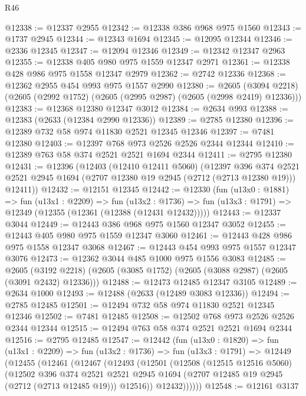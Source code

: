 \begin{lexlean}{R46}
\begin{coremodule}
@12338 := @12337 @2955
@12342 := @12338 @386 @968 @975 @1560
@12343 := @1737 @2945
@12344 := @12343 @1694
@12345 := @12095 @12344
@12346 := @2336 @12345
@12347 := @12094 @12346
@12349 := @12342 @12347 @2963
@12355 := @12338 @405 @980 @975 @1559 @12347 @2971
@12361 := @12338 @428 @986 @975 @1558 @12347 @2979
@12362 := @2742 @12336
@12368 := @12362 @2955 @454 @993 @975 @1557 @2990
@12380 := @2605
    (@3094 @2218)
    (@2605 (@2992 @1752) (@2605 (@2995 @2987) (@2605 (@2998 @2419) @12336)))
@12383 := @12368 @12380 @12347 @3012
@12384 := @2634 @993
@12388 := @12383 (@2633 (@12384 @2990 @12336))
@12389 := @2785 @12380
@12396 := @12389 @732 @58 @974 @11830 @2521 @12345 @12346
@12397 := @7481 @12380
@12403 := @12397 @768 @973 @2526 @2526 @2344 @12344
@12410 := @12389 @763 @58 @374 @2521 @2521 @1694 @2344
@12411 := @2795 @12380
@12431 := @12396
    (@12403
      (@12410 @12411 @5060)
      (@12397
        @396
        @374
        @2521
        @2521
        @2945
        @1694
        (@2707 @12380 @19 @2945 (@2712 (@2713 @12380 @19)))
        @12411))
@12432 := @12151 @12345
@12442 := @12330
    (fun (u13x0 : @1881) =>
    fun (u13x1 : @2209) =>
    fun (u13x2 : @1736) => fun (u13x3 : @1791) => @12349 (@12355 (@12361 (@12388 (@12431 @12432)))))
@12443 := @12337 @3044
@12449 := @12443 @386 @968 @975 @1560 @12347 @3052
@12455 := @12443 @405 @980 @975 @1559 @12347 @3060
@12461 := @12443 @428 @986 @975 @1558 @12347 @3068
@12467 := @12443 @454 @993 @975 @1557 @12347 @3076
@12473 := @12362 @3044 @485 @1000 @975 @1556 @3083
@12485 := @2605
    (@3192 @2218)
    (@2605 (@3085 @1752) (@2605 (@3088 @2987) (@2605 (@3091 @2432) @12336)))
@12488 := @12473 @12485 @12347 @3105
@12489 := @2634 @1000
@12493 := @12488 (@2633 (@12489 @3083 @12336))
@12494 := @2785 @12485
@12501 := @12494 @732 @58 @974 @11830 @2521 @12345 @12346
@12502 := @7481 @12485
@12508 := @12502 @768 @973 @2526 @2526 @2344 @12344
@12515 := @12494 @763 @58 @374 @2521 @2521 @1694 @2344
@12516 := @2795 @12485
@12547 := @12442
    (fun (u13x0 : @1820) =>
    fun (u13x1 : @2209) =>
    fun (u13x2 : @1736) =>
    fun (u13x3 : @1791) =>
    @12449
      (@12455
        (@12461
          (@12467
            (@12493
              (@12501
                (@12508
                  (@12515 @12516 @5060)
                  (@12502
                    @396
                    @374
                    @2521
                    @2521
                    @2945
                    @1694
                    (@2707 @12485 @19 @2945 (@2712 (@2713 @12485 @19)))
                    @12516))
                @12432))))))
@12548 := @12161 @3137

\end{coremodule}
\end{lexlean}
